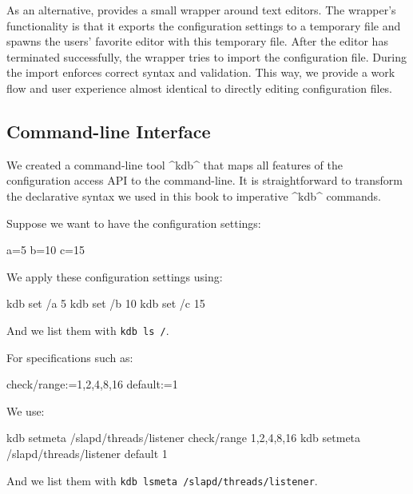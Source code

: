 As an alternative, \elektra{} provides a small wrapper around text editors.
The wrapper's functionality is that it exports the configuration settings to a temporary file and spawns the users' favorite editor with this temporary file.
After the editor has terminated successfully, the wrapper tries to import the configuration file.
During the import \elektra{} enforces correct syntax and validation.
This way, we provide a work flow and user experience almost identical to directly editing configuration files.


\subsection{Command-line Interface}
\label{sec:implication-command-line-interface}

We created a command-line tool ^kdb^ that maps all features of the configuration access API to the command-line.
It is straightforward to transform the declarative syntax we used in this book to imperative ^kdb^ commands.
\begin{example}
Suppose we want to have the configuration settings:

\begin{code}[language=CfgElektra]
a=5
b=10
c=15
\end{code}

We apply these configuration settings using:

\begin{code}[language=bash]
kdb set /a 5
kdb set /b 10
kdb set /c 15
\end{code}

And we list them with \lstinline[language=bash,morekeywords={ls}]^kdb ls /^.
\end{example}

\vspace{1em} %

\begin{example}
For specifications such as:

\begin{code}
  check/range:=1,2,4,8,16
  default:=1
\end{code}

We use:

\begin{code}[language=bash,morekeywords={setmeta}]
kdb setmeta /slapd/threads/listener check/range 1,2,4,8,16
kdb setmeta /slapd/threads/listener default 1
\end{code}

And we list them with \lstinline[language=bash,morekeywords={lsmeta}]^kdb lsmeta /slapd/threads/listener^.
\end{example}

